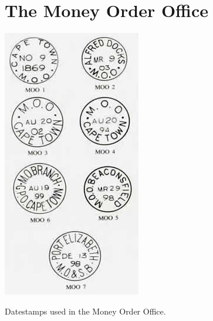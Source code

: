 \chapter{The Money Order Office}
	 

\begin{marginfigure}
\includegraphics[width=.98\textwidth]{../cape-of-good-hope/moneyorderbranch/MOO-Stamps.jpg}
\caption{Datestamps used in the Money Order Office.}
\end{marginfigure}


